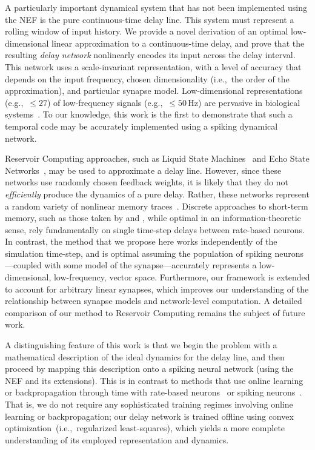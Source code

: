 A particularly important dynamical system that has not been implemented using the NEF is the pure continuous-time delay line.
This system must represent a rolling window of input history.
We provide a novel derivation of an optimal low-dimensional linear approximation to a continuous-time delay, and prove that the resulting \emph{delay network} nonlinearly encodes its input across the delay interval.
This network uses a scale-invariant representation, with a level of accuracy that depends on the input frequency, chosen dimensionality (i.e.,~the order of the approximation), and particular synapse model.
Low-dimensional representations (e.g.,~$\le 27$) of low-frequency signals (e.g.,~$\le 50$\,Hz) are pervasive in biological systems~\citep{cunningham2014dimensionality, waernberg2017low, pulvermuller1997high, singer1999neuronal}.
To our knowledge, this work is the first to demonstrate that such a temporal code may be accurately implemented using a spiking dynamical network.

Reservoir Computing approaches, such as Liquid State Machines~\citep{maass2002real} and Echo State Networks~\citep{jaeger2001echo}, may be used to approximate a delay line.
However, since these networks use randomly chosen feedback weights, it is likely that they do not {\it efficiently} produce the dynamics of a pure delay.
Rather, these networks represent a random variety of nonlinear memory traces~\citep{lukovsevicius2012reservoir}.
Discrete approaches to short-term memory, such as those taken by \citet{white2004short} and \citet{ganguli2008memory}, while optimal in an information-theoretic sense, rely fundamentally on single time-step delays between rate-based neurons.
In contrast, the method that we propose here works independently of the simulation time-step, and is optimal assuming the population of spiking neurons---coupled with some model of the synapse---accurately represents a low-dimensional, low-frequency, vector space.
Furthermore, our framework is extended to account for arbitrary linear synapses, which improves our understanding of the relationship between synapse models and network-level computation.
A detailed comparison of our method to Reservoir Computing remains the subject of future work.

A distinguishing feature of this work is that we begin the problem with a mathematical description of the ideal dynamics for the delay line, and then proceed by mapping this description onto a spiking neural network (using the NEF and its extensions).
This is in contrast to methods that use online learning or backpropagation through time with rate-based neurons~\citep{de1992gamma, sussillo2009generating} or spiking neurons~\citep{nicola2016supervised, huh2017gradient, gilra2017predicting, alemi2017learning}.
That is, we do not require any sophisticated training regimes involving online learning or backpropagation; our delay network is trained offline using convex optimization~(i.e.,~regularized least-squares), which yields a more complete understanding of its employed representation and dynamics.

